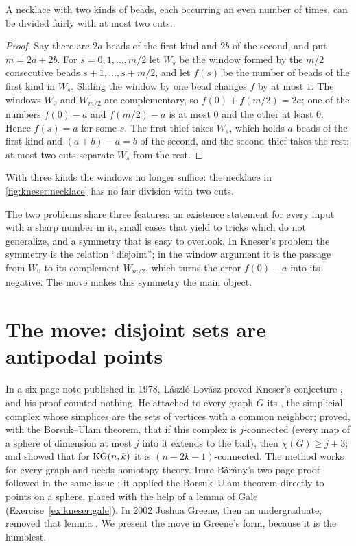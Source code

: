 \begin{refsection}
\begin{proposition}\label{prop:kneser:twokinds}
A necklace with two kinds of beads, each occurring an even number of times, can be divided fairly with at most two cuts.
\end{proposition}

\begin{proof}
Say there are $2a$ beads of the first kind and $2b$ of the second, and put $m=2a+2b$. For $s=0,1,\dots,m/2$ let $W_s$ be the window formed by the $m/2$ consecutive beads $s+1,\dots,s+m/2$, and let $f(s)$ be the number of beads of the first kind in $W_s$. Sliding the window by one bead changes $f$ by at most $1$. The windows $W_0$ and $W_{m/2}$ are complementary, so $f(0)+f(m/2)=2a$; one of the numbers $f(0)-a$ and $f(m/2)-a$ is at most $0$ and the other at least $0$. Hence $f(s)=a$ for some $s$. The first thief takes $W_s$, which holds $a$ beads of the first kind and $(a+b)-a=b$ of the second, and the second thief takes the rest; at most two cuts separate $W_s$ from the rest.
\end{proof}

With three kinds the windows no longer suffice: the necklace in \cref{fig:kneser:necklace} has no fair division with two cuts.

The two problems share three features: an existence statement for every input with a sharp number in it, small cases that yield to tricks which do not generalize, and a symmetry that is easy to overlook. In Kneser's problem the symmetry is the relation ``disjoint''; in the window argument it is the passage from $W_0$ to its complement $W_{m/2}$, which turns the error $f(0)-a$ into its negative. The move makes this symmetry the main object.

\section{The move: disjoint sets are antipodal points}\label{sec:kneser:move}

In a six-page note published in 1978, L\'aszl\'o Lov\'asz proved Kneser's conjecture \parencite{Lovasz1978}, and his proof counted nothing. He attached to every graph $G$ its , the simplicial complex whose simplices are the sets of vertices with a common neighbor; proved, with the Borsuk--Ulam theorem, that if this complex is $j$-connected (every map of a sphere of dimension at most $j$ into it extends to the ball), then $\chi(G)\ge j+3$; and showed that for $\mathrm{KG}(n,k)$ it is $(n-2k-1)$-connected. The method works for every graph and needs homotopy theory. Imre B{\'a}r{\'a}ny's two-page proof followed in the same issue \parencite{Barany1978}; it applied the Borsuk--Ulam theorem directly to points on a sphere, placed with the help of a lemma of Gale (Exercise~\ref{ex:kneser:gale}). In 2002 Joshua Greene, then an undergraduate, removed that lemma \parencite{Greene2002}. We present the move in Greene's form, because it is the humblest.


\end{refsection}
